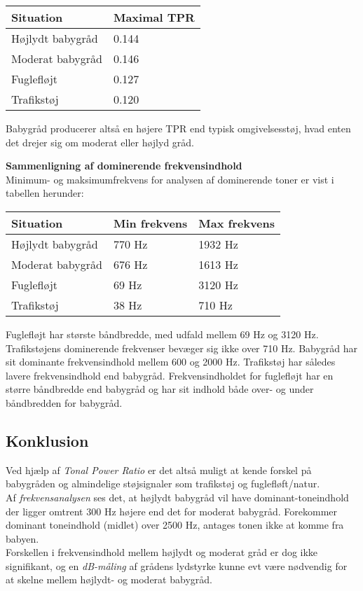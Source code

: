 \begin{center}
    \begin{tabular}{ | l | l |}
    \hline
    \textbf{Situation} & \textbf{Maximal TPR}  \\ \hline
    Højlydt babygråd & 0.144   \\ \hline
    Moderat babygråd & 0.146  \\ \hline
    Fuglefløjt & 0.127  \\ \hline
    Trafikstøj & 0.120  \\
    \hline
    \end{tabular}
\end{center}

Babygråd producerer altså en højere TPR end typisk omgivelsesstøj, hvad enten det drejer sig om moderat eller højlyd gråd.

\textbf{Sammenligning af dominerende frekvensindhold}	\\
Minimum- og maksimumfrekvens for analysen af dominerende toner er vist i tabellen herunder:
\begin{center}
    \begin{tabular}{ | l | l | l |}
    \hline
    \textbf{Situation} &	\textbf{Min frekvens}	& 	\textbf{Max frekvens}  \\ \hline
    Højlydt babygråd & 		770 Hz &					1932 Hz\\ \hline
    Moderat babygråd & 		676 Hz &					1613 Hz\\ \hline
    Fuglefløjt & 			69  Hz &					3120 Hz\\ \hline
    Trafikstøj & 			38  Hz &					710 Hz\\
    \hline
    \end{tabular}
\end{center}

Fuglefløjt har største båndbredde, med udfald mellem 69 Hz og 3120 Hz. Trafikstøjens dominerende frekvenser bevæger sig ikke over 710 Hz. Babygråd har sit dominante frekvensindhold mellem 600 og 2000 Hz. Trafikstøj har således lavere frekvensindhold end babygråd. Frekvensindholdet for fuglefløjt har en større båndbredde end babygråd og har sit indhold både over- og under båndbredden for babygråd.

\subsection{Konklusion}
Ved hjælp af \textit{Tonal Power Ratio} er det altså muligt at kende forskel på babygråden og almindelige støjsignaler som trafikstøj og fuglefløft/natur. \\
Af \textit{frekvensanalysen} ses det, at højlydt babygråd vil have dominant-toneindhold der ligger omtrent 300 Hz højere end det for moderat babygråd. Forekommer dominant toneindhold (midlet) over 2500 Hz, antages tonen ikke at komme fra babyen. \\
Forskellen i frekvensindhold mellem højlydt og moderat gråd er dog ikke signifikant, og en \textit{dB-måling} af grådens lydstyrke kunne evt være nødvendig for at skelne mellem højlydt- og moderat babygråd.